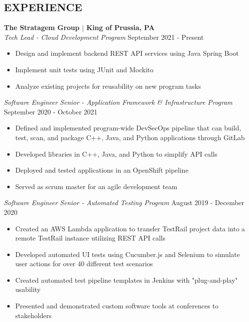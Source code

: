 \documentclass[line,resmargin,11pt]{res}
\begin{document}
\begin{resume}
\section{EXPERIENCE}
\textbf{The Stratagem Group $|$ King of Prussia, PA} \\
{\sl Tech Lead - Cloud Development Program} \hfill September 2021 - Present
	\begin{itemize} \itemsep -2pt %
        \item Design and implement backend REST API services using Java Spring Boot
        \item Implement unit tests using JUnit and Mockito
		\item Analyze existing projects for reusability on new program tasks
	\end{itemize}

{\sl Software Engineer Senior - Application Framework \& Infrastructure Program} \hfill September 2020 - October 2021
	\begin{itemize} \itemsep -2pt %
		\item Defined and implemented program-wide DevSecOps pipeline that can build, test, scan, and package C++, Java, and Python applications through GitLab
		\item Developed libraries in C++, Java, and Python to simplify API calls
		\item Deployed and tested applications in an OpenShift pipeline
		\item Served as scrum master for an agile development team
	\end{itemize}

{\sl Software Engineer Senior - Automated Testing Program} \hfill August 2019 - December 2020
	\begin{itemize} \itemsep -2pt %
		\item Created an AWS Lambda application to transfer TestRail project data  into a remote TestRail instance utilizing REST API calls
		\item Developed automated UI tests using Cucumber.js and Selenium to simulate user actions for over 40 different test scenarios
		\item Created automated test pipeline templates in Jenkins with "plug-and-play" usability
		\item Presented and demonstrated custom software tools at conferences to stakeholders
	\end{itemize}
	

\end{resume}
\end{document}

